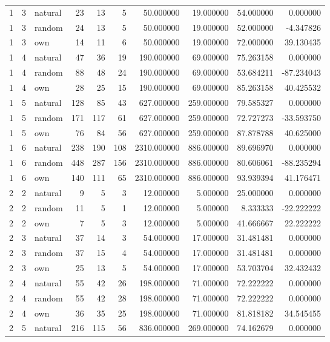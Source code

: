 \begin{table}[htbp]
\begin{tabular}{rrlrrrrrrr}
1 & 3 & natural & 23 & 13 & 5 & 50.000000 & 19.000000 & 54.000000 & 0.000000 \\
1 & 3 & random & 24 & 13 & 5 & 50.000000 & 19.000000 & 52.000000 & -4.347826 \\
1 & 3 & own & 14 & 11 & 6 & 50.000000 & 19.000000 & 72.000000 & 39.130435 \\
1 & 4 & natural & 47 & 36 & 19 & 190.000000 & 69.000000 & 75.263158 & 0.000000 \\
1 & 4 & random & 88 & 48 & 24 & 190.000000 & 69.000000 & 53.684211 & -87.234043 \\
1 & 4 & own & 28 & 25 & 15 & 190.000000 & 69.000000 & 85.263158 & 40.425532 \\
1 & 5 & natural & 128 & 85 & 43 & 627.000000 & 259.000000 & 79.585327 & 0.000000 \\
1 & 5 & random & 171 & 117 & 61 & 627.000000 & 259.000000 & 72.727273 & -33.593750 \\
1 & 5 & own & 76 & 84 & 56 & 627.000000 & 259.000000 & 87.878788 & 40.625000 \\
1 & 6 & natural & 238 & 190 & 108 & 2310.000000 & 886.000000 & 89.696970 & 0.000000 \\
1 & 6 & random & 448 & 287 & 156 & 2310.000000 & 886.000000 & 80.606061 & -88.235294 \\
1 & 6 & own & 140 & 111 & 65 & 2310.000000 & 886.000000 & 93.939394 & 41.176471 \\
2 & 2 & natural & 9 & 5 & 3 & 12.000000 & 5.000000 & 25.000000 & 0.000000 \\
2 & 2 & random & 11 & 5 & 1 & 12.000000 & 5.000000 & 8.333333 & -22.222222 \\
2 & 2 & own & 7 & 5 & 3 & 12.000000 & 5.000000 & 41.666667 & 22.222222 \\
2 & 3 & natural & 37 & 14 & 3 & 54.000000 & 17.000000 & 31.481481 & 0.000000 \\
2 & 3 & random & 37 & 15 & 4 & 54.000000 & 17.000000 & 31.481481 & 0.000000 \\
2 & 3 & own & 25 & 13 & 5 & 54.000000 & 17.000000 & 53.703704 & 32.432432 \\
2 & 4 & natural & 55 & 42 & 26 & 198.000000 & 71.000000 & 72.222222 & 0.000000 \\
2 & 4 & random & 55 & 42 & 28 & 198.000000 & 71.000000 & 72.222222 & 0.000000 \\
2 & 4 & own & 36 & 35 & 25 & 198.000000 & 71.000000 & 81.818182 & 34.545455 \\
2 & 5 & natural & 216 & 115 & 56 & 836.000000 & 269.000000 & 74.162679 & 0.000000 \\

\end{tabular}
\end{table}
